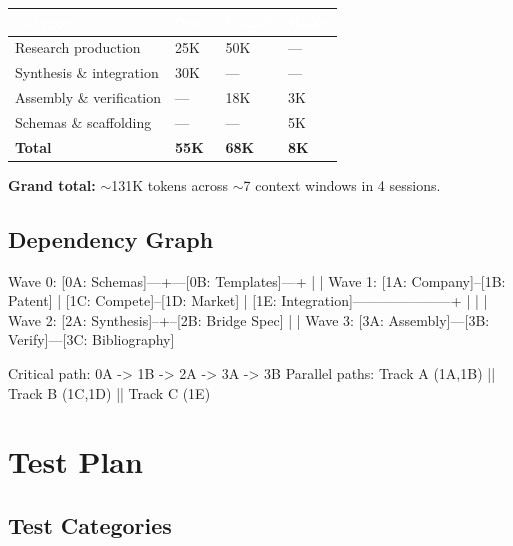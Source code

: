 \documentclass[11pt,letterpaper]{article}
\newcommand{\tableheader}[1]{\textbf{\sffamily\textcolor{white}{#1}}}
\begin{document}
\begin{center}
\begin{tabularx}{\textwidth}{L{4cm}C{2cm}C{2cm}C{2cm}}
\toprule
{}
\tableheader{Category} & \tableheader{Opus} & \tableheader{Sonnet} & \tableheader{Haiku} \\
\midrule
Research production & 25K & 50K & --- \\
Synthesis \& integration & 30K & --- & --- \\
Assembly \& verification & --- & 18K & 3K \\
Schemas \& scaffolding & --- & --- & 5K \\
\midrule
\textbf{Total} & \textbf{55K} & \textbf{68K} & \textbf{8K} \\
\bottomrule
\end{tabularx}
\end{center}

\textbf{Grand total:} $\sim$131K tokens across $\sim$7 context windows in 4 sessions.

\subsection{Dependency Graph}

\begin{asciibox}
Wave 0:  [0A: Schemas]---+---[0B: Templates]---+
                         |                      |
Wave 1:  [1A: Company]--[1B: Patent]           |
         [1C: Compete]--[1D: Market]           |
         [1E: Integration]---------------------+
                |          |         |
Wave 2:  [2A: Synthesis]--+--[2B: Bridge Spec]
                |                    |
Wave 3:  [3A: Assembly]---[3B: Verify]---[3C: Bibliography]

Critical path: 0A -> 1B -> 2A -> 3A -> 3B
Parallel paths: Track A (1A,1B) || Track B (1C,1D) || Track C (1E)
\end{asciibox}

\section{Test Plan}

\subsection{Test Categories}
\end{document}
